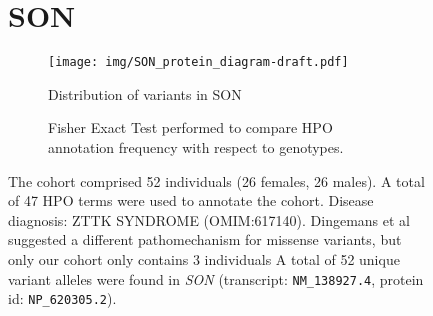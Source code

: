 \begin{figure}[htbp]
\section*{SON}
\centering
\begin{subfigure}[b]{0.95\textwidth}
\centering
\texttt{[image:  img/SON\_protein\_diagram-draft.pdf]} 
\captionsetup{justification=raggedright,singlelinecheck=false}
\caption{Distribution of variants in SON}
\end{subfigure}

\vspace{2em}

\begin{subfigure}[b]{0.95\textwidth}
\centering
{}
\captionsetup{justification=raggedright,singlelinecheck=false}
\caption{Fisher Exact Test performed to compare HPO annotation frequency with respect to genotypes.}
\end{subfigure}

\vspace{2em}

\caption{ The cohort comprised 52 individuals (26 females, 26 males). A total of 47 HPO terms were used to annotate the cohort. Disease diagnosis: ZTTK SYNDROME (OMIM:617140). Dingemans et al \cite{PMID_34521999} suggested a different pathomechanism for missense variants, but only our cohort only contains 3 individuals A total of 52 unique variant alleles were found in \textit{SON} (transcript: \texttt{NM\_138927.4}, protein id: \texttt{NP\_620305.2}).}
\end{figure}
